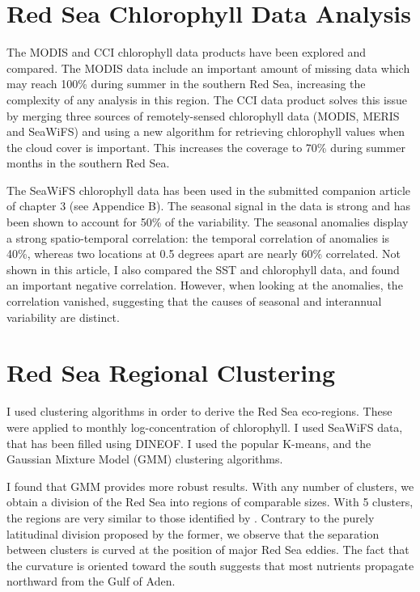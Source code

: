 \section{Red Sea Chlorophyll Data Analysis}

The MODIS and CCI chlorophyll data products have been explored and compared.
The MODIS data include an important amount of missing data which may reach
100\% during summer in the southern Red Sea, increasing the complexity of any
analysis in this region. The CCI data product solves this issue by merging
three sources of remotely-sensed chlorophyll data (MODIS, MERIS and SeaWiFS)
and using a new algorithm for retrieving chlorophyll values when the cloud
cover is important.  This increases the coverage to 70\% during summer months
in the southern Red Sea.

The SeaWiFS chlorophyll data has been used in the submitted companion article
of chapter 3 (see Appendice B).  The seasonal signal in the data is strong and
has been shown to account for 50\% of the variability. The seasonal anomalies
display a strong spatio-temporal correlation: the temporal correlation of
anomalies is 40\%, whereas two locations at 0.5 degrees apart are nearly 60\%
correlated. Not shown in this article, I also compared the SST and chlorophyll
data, and found an important negative correlation. However, when looking at the
anomalies, the correlation vanished, suggesting that the causes of seasonal and
interannual variability are distinct.

\section{Red Sea Regional Clustering}

I used clustering algorithms in order to derive the Red Sea eco-regions. These
were applied to monthly log-concentration of chlorophyll. I used SeaWiFS data,
that has been filled using DINEOF. I used the popular K-means, and the Gaussian
Mixture Model (GMM) clustering algorithms.

I found that GMM provides more robust results. With any number of clusters, we
obtain a division of the Red Sea into regions of comparable sizes.  With 5
clusters, the regions are very similar to those identified by
\citet{Raitsos2013}.  Contrary to the purely latitudinal division proposed by
the former, we observe that the separation between clusters is curved at the
position of major Red Sea eddies.  The fact that the curvature is oriented
toward the south suggests that most nutrients propagate northward from the Gulf
of Aden.

